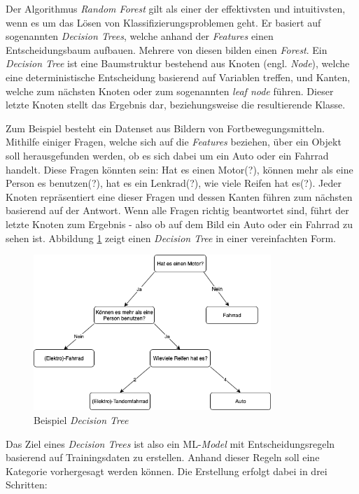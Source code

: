 Der Algorithmus \textit{Random Forest} gilt als einer der effektivsten und intuitivsten, wenn es um das Lösen von Klassifizierungsproblemen geht. Er basiert auf sogenannten \textit{Decision Trees}, welche anhand der \textit{Features} einen Entscheidungsbaum aufbauen. Mehrere von diesen bilden einen \textit{Forest}. Ein \textit{Decision Tree} ist eine Baumstruktur bestehend aus Knoten (engl. \textit{Node}), welche eine deterministische Entscheidung basierend auf Variablen treffen, und Kanten, welche zum nächsten Knoten oder zum sogenannten \textit{leaf node} führen. Dieser letzte Knoten stellt das Ergebnis dar, beziehungsweise die resultierende Klasse.

Zum Beispiel besteht ein Datenset aus Bildern von Fortbewegungsmitteln. Mithilfe einiger Fragen, welche sich auf die \textit{Features} beziehen, über ein Objekt soll herausgefunden werden, ob es sich dabei um ein Auto oder ein Fahrrad handelt. Diese Fragen könnten sein: Hat es einen Motor(?), können mehr als eine Person es benutzen(?), hat es ein Lenkrad(?), wie viele Reifen hat es(?). Jeder Knoten repräsentiert eine dieser Fragen und dessen Kanten führen zum nächsten basierend auf der Antwort. Wenn alle Fragen richtig beantwortet sind, führt der letzte Knoten zum Ergebnis - also ob auf dem Bild ein Auto oder ein Fahrrad zu sehen ist. Abbildung \ref{fig:decision_tree} zeigt einen \textit{Decision Tree} in einer vereinfachten Form.

\begin{figure}[htbp]
	\centering
		\includegraphics[width=0.8\textwidth]{images/decision_tree.png}
	\caption{Beispiel \textit{Decision Tree}}
	\label{fig:decision_tree}
\end{figure}

Das Ziel eines \textit{Decision Trees} ist also ein ML-\textit{Model} mit Entscheidungsregeln basierend auf Trainingsdaten zu erstellen. Anhand dieser Regeln soll eine Kategorie vorhergesagt werden können. Die Erstellung erfolgt dabei in drei Schritten:


